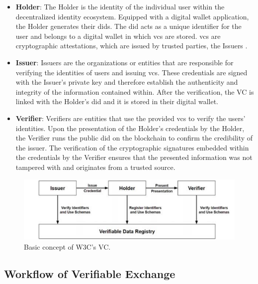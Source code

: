 \begin{itemize}
  \item \textbf{Holder}: The Holder is the identity of the individual user within the decentralized identity ecosystem. Equipped with a digital wallet application, the 
  Holder generates their \gls{did}s. The \gls{did} acts as a unique identifier for the user and belongs to a digital wallet in which \gls{vc}s are stored. \gls{vc}s are 
  cryptographic attestations, which are issued by trusted parties, the Issuers \cite{dockio}.
  \item \textbf{Issuer}: Issuers are the organizations or entities that are responsible for verifying the identities of users and issuing \gls{vc}s. These 
  credentials are signed with the Issuer's private key and therefore establish the authenticity and integrity of the information contained within. After the verification, 
  the VC is linked with the Holder's \gls{did} and it is stored in their digital wallet.
  \item \textbf{Verifier}: Verifiers are entities that use the provided \gls{vc}s to verify the users' identities. Upon the presentation of the Holder's 
  credentials by the Holder, the Verifier runs the public \gls{did} on the blockchain to confirm the credibility of the issuer. The verification of the cryptographic signatures 
  embedded within the credentials by the Verifier ensures that the presented information was not tampered with and originates from a trusted source.
\end{itemize}
 
\begin{figure}[h]  
  \centering
  \includegraphics[width=1\textwidth]{Images/c4_6.png} 
  \caption{Basic concept of W3C's VC.}
\end{figure}

\subsection{Workflow of Verifiable Exchange}

